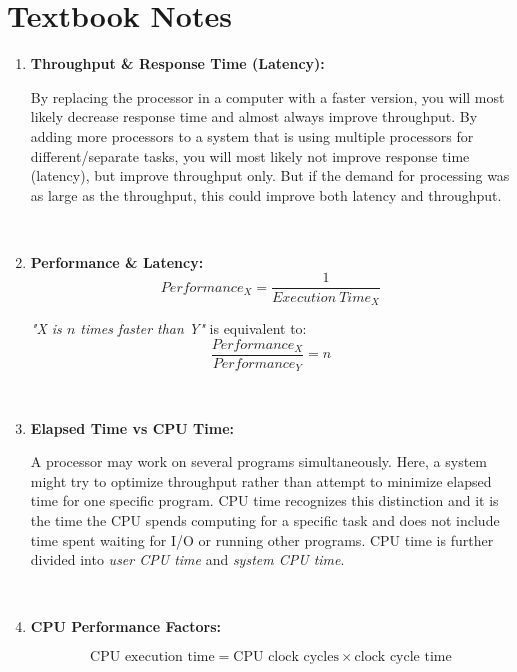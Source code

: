\documentclass[12pt]{article}
\begin{document}
\clearpage 

\section{Textbook Notes}

\begin{enumerate}
    \item \textbf{Throughput \& Response Time (Latency):} 
    
    \quad By replacing the processor in a computer with a faster version, you will most likely decrease response time and almost always improve throughput. By adding more processors to a system that is using multiple processors for different/separate tasks, you will most likely not improve response time (latency), but improve throughput only. But if the demand for processing was as large as the throughput, this could improve both latency and throughput.
    
    \ 
    
    \item \textbf{Performance \& Latency:}
    \begin{equation}
    Performance_{X} = \frac{1}{Execution\ Time_{X}}
    \end{equation}
    
    \textit{"X is $n$ times faster than Y"} is equivalent to: 
    \begin{equation}
    \frac{Performance_{X}}{Performance_{Y}} = n
    \end{equation}
    
    \
    
    \item \textbf{Elapsed Time vs CPU Time:}
    
    \quad A processor may work on several programs simultaneously. Here, a system might try to optimize throughput rather than attempt to minimize elapsed time for one specific program. CPU time recognizes this distinction and it is the time the CPU spends computing for a specific task and does not include time spent waiting for I/O or running other programs. CPU time is further divided into \textit{user CPU time} and \textit{system CPU time}.
    
    \ 
    
    \item \textbf{CPU Performance Factors:}
    
    \begin{equation}
        \text{CPU execution time} = \text{CPU clock cycles} \times \text{clock cycle time}
    \end{equation}
    

\end{enumerate}
\end{document}
